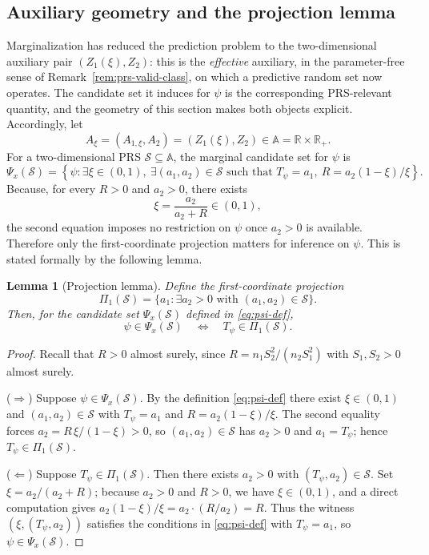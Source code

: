 \documentclass[12pt]{article}
\newtheorem{lemma}{Lemma}
\newcommand{\R}{\mathbb R}
\begin{document}
\subsection{Auxiliary geometry and the projection lemma}

Marginalization has reduced the prediction problem to the two-dimensional
auxiliary pair \((Z_1(\xi),Z_2)\): this is the \emph{effective} auxiliary, in
the parameter-free sense of Remark~\ref{rem:prs-valid-class}, on which a
predictive random set now operates.  The candidate set it induces for \(\psi\) is
the corresponding PRS-relevant quantity, and the geometry of this section makes
both objects explicit.  Accordingly, let
\[
A_\xi=(A_{1,\xi},A_2)=(Z_1(\xi),Z_2)
\in\mathbb A=\R\times\R_+.
\]
For a two-dimensional PRS \(\mathcal S\subseteq\mathbb A\), the marginal
candidate set for \(\psi\) is
\begin{equation}
\Psi_x(\mathcal S)
=
\left\{\psi:
\exists \xi\in(0,1),\ \exists(a_1,a_2)\in\mathcal S
\text{ such that }
T_\psi=a_1,\ R=a_2(1-\xi)/\xi
\right\}.
\label{eq:psi-def}
\end{equation}
Because, for every \(R>0\) and \(a_2>0\), there exists
\[
\xi=\frac{a_2}{a_2+R}\in(0,1),
\]
the second equation imposes no restriction on \(\psi\) once \(a_2>0\) is
available.  Therefore only the first-coordinate projection matters for
inference on \(\psi\).  This is stated formally by the following lemma.

\begin{lemma}[Projection lemma]
\label{lem:projection}
Define the first-coordinate projection
\[
\Pi_1(\mathcal S)=\{a_1:\exists a_2>0\text{ with }(a_1,a_2)\in\mathcal S\}.
\]
Then, for the candidate set \(\Psi_x(\mathcal S)\) defined in
\eqref{eq:psi-def},
\[
\psi\in\Psi_x(\mathcal S)
\quad\Longleftrightarrow\quad
T_\psi\in\Pi_1(\mathcal S).
\]
\end{lemma}

\begin{proof}
Recall that \(R>0\) almost surely, since \(R=n_1S_2^2/(n_2S_1^2)\) with
\(S_1,S_2>0\) almost surely.

(\(\Rightarrow\))  Suppose \(\psi\in\Psi_x(\mathcal S)\).  By the definition
\eqref{eq:psi-def} there exist \(\xi\in(0,1)\) and \((a_1,a_2)\in\mathcal S\)
with \(T_\psi=a_1\) and \(R=a_2(1-\xi)/\xi\).  The second equality forces
\(a_2=R\,\xi/(1-\xi)>0\), so \((a_1,a_2)\in\mathcal S\) has \(a_2>0\) and
\(a_1=T_\psi\); hence \(T_\psi\in\Pi_1(\mathcal S)\).

(\(\Leftarrow\))  Suppose \(T_\psi\in\Pi_1(\mathcal S)\).  Then there exists
\(a_2>0\) with \((T_\psi,a_2)\in\mathcal S\).  Set
\(\xi=a_2/(a_2+R)\); because \(a_2>0\) and \(R>0\), we have \(\xi\in(0,1)\), and a
direct computation gives \(a_2(1-\xi)/\xi=a_2\cdot(R/a_2)=R\).  Thus the witness
\((\xi,(T_\psi,a_2))\) satisfies the conditions in \eqref{eq:psi-def} with
\(T_\psi=a_1\), so \(\psi\in\Psi_x(\mathcal S)\).
\end{proof}
\end{document}
